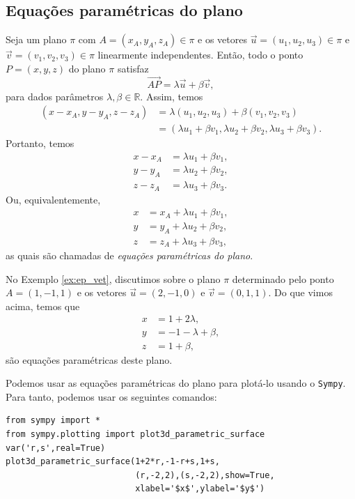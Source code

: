 \subsection{Equações paramétricas do plano}

Seja um plano $\pi$ com $A=(x_A,y_A,z_A)\in\pi$ e os vetores $\vec{u}=(u_1,u_2,u_3)\in\pi$ e $\vec{v}=(v_1,v_2,v_3)\in\pi$ linearmente independentes. Então, todo o ponto $P=(x,y,z)$ do plano $\pi$ satisfaz
\begin{equation}
  \overrightarrow{AP} = \lambda\vec{u}+\beta\vec{v},
\end{equation}
para dados parâmetros $\lambda,\beta\in\mathbb{R}$. Assim, temos
\begin{align}
  (x-x_A,y-y_A,z-z_A) &= \lambda(u_1,u_2,u_3)+\beta(v_1,v_2,v_3)\\
                      &= (\lambda u_1+\beta v_1,\lambda u_2+\beta v_2,\lambda u_3+\beta v_3).
\end{align}
Portanto, temos
\begin{align}
  x-x_A &= \lambda u_1+\beta v_1,\\
  y-y_A &= \lambda u_2+\beta v_2,\\
  z-z_A &= \lambda u_3+\beta v_3.
\end{align}
Ou, equivalentemente,
\begin{align}
  x &= x_A + \lambda u_1+\beta v_1,\\
  y &= y_A + \lambda u_2+\beta v_2,\\
  z &= z_A + \lambda u_3+\beta v_3,
\end{align}
as quais são chamadas de \emph{equações paramétricas do plano}.

\begin{ex}
  No Exemplo \ref{ex:ep_vet}, discutimos sobre o plano $\pi$ determinado pelo ponto $A = (1,-1,1)$ e os vetores $\vec{u}=(2,-1,0)$ e $\vec{v}=(0,1,1)$. Do que vimos acima, temos que
  \begin{align}
    x &= 1 + 2\lambda,\\
    y &= -1 -\lambda + \beta,\\
    z &= 1+\beta,
  \end{align}
  são equações paramétricas deste plano.

  \ifispython
  Podemos usar as equações paramétricas do plano para plotá-lo usando o \verb+Sympy+. Para tanto, podemos usar os seguintes comandos:
\begin{verbatim}
from sympy import *
from sympy.plotting import plot3d_parametric_surface
var('r,s',real=True)
plot3d_parametric_surface(1+2*r,-1-r+s,1+s,
                          (r,-2,2),(s,-2,2),show=True,
                          xlabel='$x$',ylabel='$y$')
\end{verbatim}
  \fi
\end{ex}

